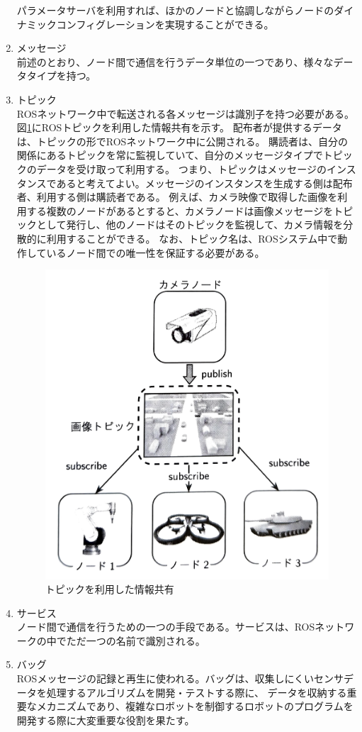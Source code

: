 \begin{enumerate}
  パラメータサーバを利用すれば、ほかのノードと協調しながらノードのダイナミックコンフィグレーションを実現することができる。
  \item メッセージ\\
  前述のとおり、ノード間で通信を行うデータ単位の一つであり、様々なデータタイプを持つ。
  \item トピック\\
  ROSネットワーク中で転送される各メッセージは識別子を持つ必要がある。図\ref{auto:kyoyu}にROSトピックを利用した情報共有を示す。
  配布者が提供するデータは、トピックの形でROSネットワーク中に公開される。
  購読者は、自分の関係にあるトピックを常に監視していて、自分のメッセージタイプでトピックのデータを受け取って利用する。
  つまり、トピックはメッセージのインスタンスであると考えてよい。メッセージのインスタンスを生成する側は配布者、利用する側は購読者である。
  例えば、カメラ映像で取得した画像を利用する複数のノードがあるとすると、カメラノードは画像メッセージをトピックとして発行し、他のノードはそのトピックを監視して、カメラ情報を分散的に利用することができる。
  なお、トピック名は、ROSシステム中で動作しているノード間での唯一性を保証する必要がある。
  \begin{figure}[h]
    \begin{center}
      \includegraphics[width=.8\linewidth]{img/auto_8.pdf}
      \caption{トピックを利用した情報共有}
      \label{auto:kyoyu}
    \end{center}
  \end{figure}
  \item サービス\\
  ノード間で通信を行うための一つの手段である。サービスは、ROSネットワークの中でただ一つの名前で識別される。
  \item バッグ\\
  ROSメッセージの記録と再生に使われる。バッグは、収集しにくいセンサデータを処理するアルゴリズムを開発・テストする際に、
  データを収納する重要なメカニズムであり、複雑なロボットを制御するロボットのプログラムを開発する際に大変重要な役割を果たす。
\end{enumerate}

